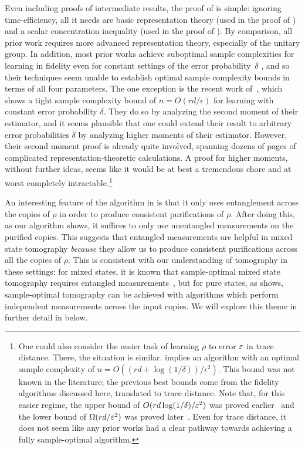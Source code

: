 \documentclass{article}
\begin{document}
Even including proofs of intermediate results, the proof of  is simple: ignoring time-efficiency, all it needs are basic representation theory (used in the proof of ) and a scalar concentration inequality (used in the proof of ).
By comparison, all prior work requires more advanced representation theory, especially of the unitary group.
In addition, most prior works achieve suboptimal sample complexities for learning in fidelity even for constant settings of the error probability~$\delta$ \cite{HHJ+16,OW16,OW17a}, and so their techniques seem unable to establish optimal sample complexity bounds in terms of all four parameters.
The one exception is the recent work of~\cite{PSW25},
which shows a tight sample complexity bound of $n = O(rd/\epsilon)$ for learning with constant error probability $\delta$.
They do so by analyzing the second moment of their estimator, and it seems plausible that one could extend their result to arbitrary error probabilities $\delta$ by analyzing higher moments of their estimator.
However, their second moment proof is already quite involved, spanning dozens of pages of complicated representation-theoretic calculations.
A proof for higher moments, without further ideas, seems like it would be at best a tremendous chore and at worst completely intractable.\footnote{
    One could also consider the easier task of learning $\rho$ to error $\varepsilon$ in trace distance.
    There, the situation is similar.
     implies an algorithm with an optimal sample complexity of
    $
        n = O((rd + \log(1/\delta))/\epsilon^2)
    $.
    This bound was not known in the literature; the previous best bounds come from the fidelity algorithms discussed here, translated to trace distance.
    Note that, for this easier regime, the upper bound of $O(rd\log(1/\delta) / \varepsilon^2)$ was proved earlier~\cite{OW15} and the lower bound of $\Omega(rd/\varepsilon^2)$ was proved later~\cite{SSW25}.
    Even for trace distance, it does not seem like any prior works had a clear pathway towards achieving a fully sample-optimal algorithm.
}


An interesting feature of the algorithm in  is that it only uses entanglement across the copies of $\rho$ in order to produce consistent purifications of $\rho$.
After doing this, as our algorithm shows,
it suffices to only use unentangled measurements on the purified copies.
This suggests that entangled measurements are helpful in mixed state tomography \emph{because} they allow us to produce consistent purifications across all the copies of $\rho$.
This is consistent with our understanding of tomography in these settings: for mixed states, it is known that sample-optimal mixed state tomography requires entangled measurements~\cite{CHL+23,CLL24a}, but for pure states, as  shows, sample-optimal tomography can be achieved with algorithms which perform independent measurements across the input copies.
We will explore this theme in further detail in  below.
\end{document}
